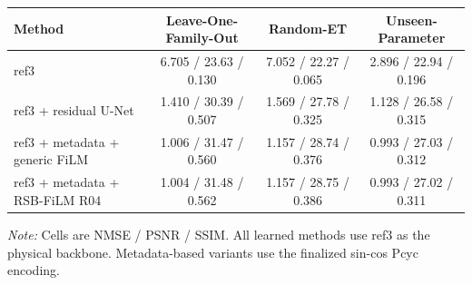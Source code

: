 \begin{tabular}{lccc}
\toprule
Method & Leave-One-Family-Out & Random-ET & Unseen-Parameter \\
\midrule
ref3 & 6.705 / 23.63 / 0.130 & 7.052 / 22.27 / 0.065 & 2.896 / 22.94 / 0.196 \\
ref3 + residual U-Net & 1.410 / 30.39 / 0.507 & 1.569 / 27.78 / 0.325 & 1.128 / 26.58 / 0.315 \\
ref3 + metadata + generic FiLM & 1.006 / 31.47 / 0.560 & 1.157 / 28.74 / 0.376 & 0.993 / 27.03 / 0.312 \\
ref3 + metadata + RSB-FiLM R04 & 1.004 / 31.48 / 0.562 & 1.157 / 28.75 / 0.386 & 0.993 / 27.02 / 0.311 \\
\bottomrule
\end{tabular}

\noindent\emph{Note:} Cells are NMSE / PSNR / SSIM. All learned methods use ref3 as the physical backbone. Metadata-based variants use the finalized sin-cos Pcyc encoding.
